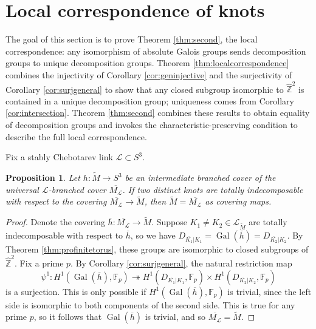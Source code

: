 \documentclass{amsart}
\theoremstyle{plain}
\theoremstyle{definition}
\theoremstyle{plain}
\newtheorem{prop}[theorem]{Proposition}
\theoremstyle{plain}
\theoremstyle{plain}
\theoremstyle{remark}
\theoremstyle{remark}
\theoremstyle{plain}
\theoremstyle{definition}
\theoremstyle{plain}
\DeclareMathOperator{\Gal}{\mathrm{Gal}}
\theoremstyle{plain}
\theoremstyle{plain}
\numberwithin{equation}{section}
\begin{document}
\section{Local correspondence of knots}\label{sec:localcorr}

The goal of this section is to prove Theorem \ref{thm:second}, the local correspondence: any isomorphism of absolute Galois groups sends decomposition groups to unique decomposition groups. Theorem \ref{thm:localcorrespondence} combines the injectivity of Corollary \ref{cor:geninjective} and the surjectivity of Corollary \ref{cor:surjgeneral} to show that any closed subgroup isomorphic to $\widehat{\mathbb{Z}}^2$ is contained in a unique decomposition group; uniqueness comes from Corollary \ref{cor:intersection}. Theorem \ref{thm:second} combines these results to obtain equality of decomposition groups and invokes the characteristic-preserving condition to describe the full local correspondence.

\medskip

Fix a stably Chebotarev link $\mathcal{L} \subset S^3$. 

\begin{prop}\label{prop:uniqueness}
Let $h: \widetilde{M} \to S^3$ be an intermediate branched cover of the universal $\mathcal{L}$-branched cover $\overline{M_{\mathcal{L}}}$. If two distinct knots are totally indecomposable with respect to the covering $\overline{M_{\mathcal{L}}} \to \widetilde{M}$, then $\widetilde{M}=\overline{M_{\mathcal{L}}}$ as covering maps. 
\end{prop}

\begin{proof}
Denote the covering $\overline{h}: \overline{M_{\mathcal{L}}} \to \widetilde{M}$. Suppose $K_1 \neq K_2 \in \mathcal{L}_{\widetilde M}$ are totally indecomposable with respect to $\overline{h}$, so we have $D_{\overline{K_1}|K_1} = \Gal(\overline{h}) = D_{\overline{K_2}|K_2}$. By Theorem \ref{thm:profinitetorus}, these groups are isomorphic to closed subgroups of $\widehat{\mathbb{Z}}^2$. Fix a prime $p$. By Corollary \ref{cor:surjgeneral}, the natural restriction map
\begin{equation}
    \psi^1: H^1(\Gal(\overline{h}), \mathbb{F}_p) \twoheadrightarrow H^1(D_{\overline{K_1}|K_1}, \mathbb{F}_p) \times H^1(D_{\overline{K_2}|K_2}, \mathbb{F}_p)
\end{equation}
is a surjection. This is only possible if $H^1(\Gal(\overline{h}), \mathbb{F}_p)$ is trivial, since the left side is isomorphic to both components of the second side. This is true for any prime $p$, so it follows that $\Gal(\overline{h})$ is trivial, and so $\overline{M_\mathcal{L}} = \widetilde{M}$.
\end{proof}
\end{document}
